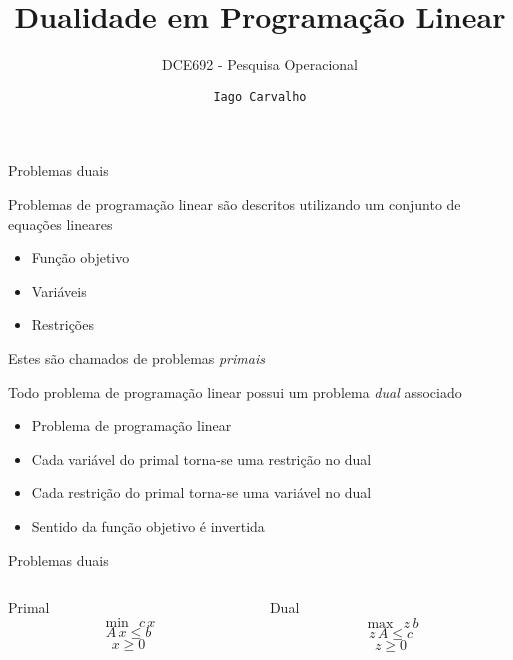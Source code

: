 \documentclass[compress,mathserif]{beamer}
\title{Dualidade em Programação Linear}
\subtitle{DCE692 - Pesquisa Operacional}
\author{\texttt{Iago Carvalho}}
\institute{\texttt{Departamento de Ciência da Computação}}
\begin{document}
\begin{frame}
\titlepage

\end{frame}


\begin{frame}{Problemas duais}

Problemas de programação linear são descritos utilizando um conjunto de equações lineares
\begin{itemize}
    \item Função objetivo
    \item Variáveis
    \item Restrições
\end{itemize}

Estes são chamados de problemas \textit{primais}

\vspace{0.5cm}

Todo problema de programação linear possui um problema \textit{dual} associado
\begin{itemize}
    \item Problema de programação linear
    \item Cada variável do primal torna-se uma restrição no dual
    \item Cada restrição do primal torna-se uma variável no dual
    \item Sentido da função objetivo é invertida
\end{itemize}
\end{frame}


\begin{frame}{Problemas duais}

\begin{columns}[T]
    \begin{column}{.44\textwidth}
        \centering Primal
        $$\min~~c\,x$$
        $$A\,x \leq b$$
        $$x \geq 0$$
    \end{column}
    \begin{column}{.49\textwidth}
        \centering Dual
        $$ \max~~z\,b $$
            $$ z\,A \leq c$$
            $$ z \geq 0 $$
    \end{column}
\end{columns}
\end{frame}

\end{document}
